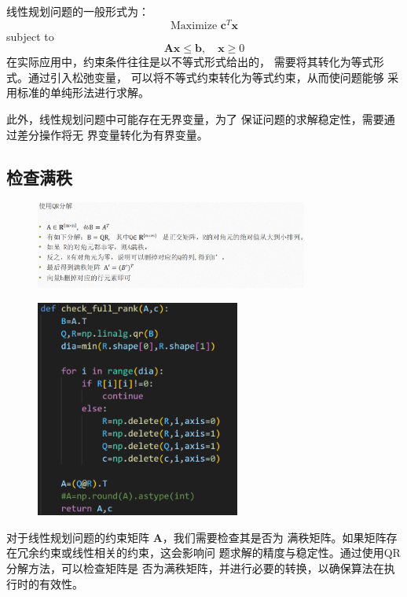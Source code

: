\documentclass[10pt,a4paper,oneside]{article}
\begin{document}
线性规划问题的一般形式为：
\[
\text{Maximize } \mathbf{c}^T \mathbf{x}
\]
subject to
\[
\mathbf{A} \mathbf{x} \leq \mathbf{b}, \quad \mathbf{x} \geq 0
\]
在实际应用中，约束条件往往是以不等式形式给出的，
需要将其转化为等式形式。通过引入松弛变量，
可以将不等式约束转化为等式约束，从而使问题能够
采用标准的单纯形法进行求解。

此外，线性规划问题中可能存在无界变量，为了
保证问题的求解稳定性，需要通过差分操作将无
界变量转化为有界变量。

\subsection{检查满秩}

\begin{figure}[H]
    \centering
    \includegraphics[width=0.8\textwidth]{屏幕截图 2024-11-05 111203.png}
\end{figure}

\begin{figure}[H]
    \centering
    \includegraphics[width=0.6\textwidth]{屏幕截图 2024-11-05 104551.png}
\end{figure}

对于线性规划问题的约束矩阵 $\mathbf{A}$，我们需要检查其是否为
满秩矩阵。如果矩阵存在冗余约束或线性相关的约束，这会影响问
题求解的精度与稳定性。通过使用QR分解方法，可以检查矩阵是
否为满秩矩阵，并进行必要的转换，以确保算法在执行时的有效性。
\end{document}
